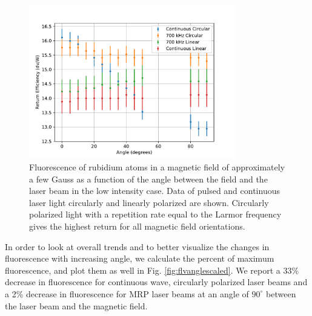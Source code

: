 \begin{figure}[htb]
	\centering
	\includegraphics[width=0.8\textwidth]{../../MRPData/April16/together.pdf}
	\caption{Fluorescence of rubidium atoms in a magnetic field of approximately a few Gauss as a function of the angle between the field and the laser beam in the low intensity case. Data of pulsed and continuous laser light circularly and linearly polarized are shown. Circularly polarized light with a repetition rate equal to the Larmor frequency gives the highest return for all magnetic field orientations.}
	\label{fig:flvangle2}
\end{figure}

In order to look at overall trends and to better visualize the changes in fluorescence with increasing angle, we calculate the percent of maximum fluorescence, and plot them as well in Fig. \ref{fig:flvanglescaled}. We report a 33\% decrease in fluorescence for continuous wave, circularly polarized laser beams and a 2\% decrease in fluorescence for MRP laser beams at an angle of $90 ^{\circ}$ between the laser beam and the magnetic field.

